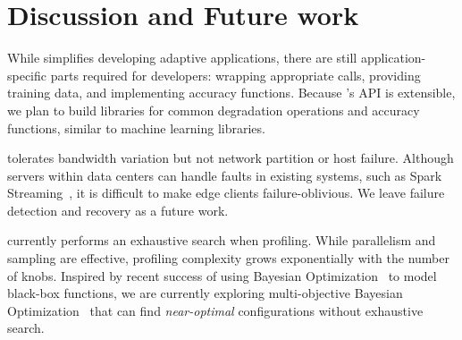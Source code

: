 \section{Discussion and Future work}
\label{sec:discussion}

 While \sysname{} simplifies developing
adaptive applications, there are still application-specific parts required for
developers: wrapping appropriate \maybe{} calls, providing training data, and
implementing accuracy functions. Because \sysname{}'s API is extensible, we plan
to build libraries for common degradation operations and accuracy functions,
similar to machine learning libraries.

 \sysname{} tolerates bandwidth variation
but not network partition or host failure. Although servers within data centers
can handle faults in existing systems, such as Spark
Streaming~\cite{zaharia2013discretized}, it is difficult to make edge clients
failure-oblivious.  We leave failure detection and recovery as a future work.

 \sysname{} currently performs an exhaustive search when
profiling. While parallelism and sampling are effective, profiling complexity
grows exponentially with the number of knobs. Inspired by recent success of
using Bayesian Optimization~\cite{snoek2012practical, alipourfard2017cherrypick,
  solnik2017bayesian} to model black-box functions, we are currently exploring
multi-objective Bayesian Optimization~\cite{hernandez2016predictive} that can
find \textit{near-optimal} configurations without exhaustive search.



